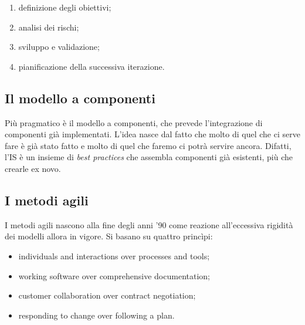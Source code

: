 \documentclass[a4paper]{article}
\begin{document}
	\begin{enumerate}
		
			
	\item definizione degli obiettivi;
			
	\item analisi dei rischi;
			
	\item sviluppo e validazione;
			
	\item pianificazione della successiva iterazione.
		
	\end{enumerate}


		
	\subsection{Il modello a componenti}

		
Più pragmatico è il modello a componenti, che prevede l'integrazione di componenti già implementati. L'idea nasce dal fatto che molto di quel che ci serve fare è già stato fatto e molto di quel che faremo ci potrà servire ancora. Difatti, l'IS è un insieme di \emph{best practices} che assembla componenti già esistenti, più che crearle ex novo.

		
	\subsection{I metodi agili}

		
I metodi agili nascono alla fine degli anni '90 come reazione all'eccessiva rigidità dei modelli allora in vigore. Si basano su quattro princìpi:
		
	\begin{itemize}
		
			
	\item individuals and interactions over processes and tools;
			
	\item working software over comprehensive documentation;
			
	\item customer collaboration over contract negotiation;
			
	\item responding to change over following a plan.
		
	\end{itemize}

	
\end{document}
